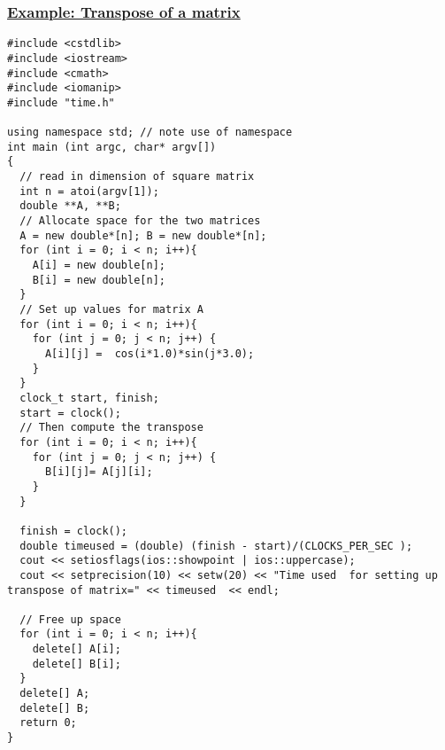 \documentclass{beamer}
\begin{document}
\begin{frame}
\frametitle{\href{{https://github.com/CompPhysics/ComputationalPhysicsMSU/blob/master/doc/Programs/LecturePrograms/programs/Classes/cpp/program8.cpp}}{Example: Transpose of a matrix}}

\begin{Verbatim}[numbers=none,fontsize=\fontsize{9pt}{9pt},baselinestretch=0.95]
#include <cstdlib>
#include <iostream>
#include <cmath>
#include <iomanip>
#include "time.h"

using namespace std; // note use of namespace
int main (int argc, char* argv[])
{
  // read in dimension of square matrix
  int n = atoi(argv[1]);
  double **A, **B;
  // Allocate space for the two matrices
  A = new double*[n]; B = new double*[n];
  for (int i = 0; i < n; i++){
    A[i] = new double[n];
    B[i] = new double[n];
  }
  // Set up values for matrix A
  for (int i = 0; i < n; i++){
    for (int j = 0; j < n; j++) {
      A[i][j] =  cos(i*1.0)*sin(j*3.0);
    }
  }
  clock_t start, finish;
  start = clock();
  // Then compute the transpose
  for (int i = 0; i < n; i++){
    for (int j = 0; j < n; j++) {
      B[i][j]= A[j][i];
    }
  }

  finish = clock();
  double timeused = (double) (finish - start)/(CLOCKS_PER_SEC );
  cout << setiosflags(ios::showpoint | ios::uppercase);
  cout << setprecision(10) << setw(20) << "Time used  for setting up transpose of matrix=" << timeused  << endl;

  // Free up space
  for (int i = 0; i < n; i++){
    delete[] A[i];
    delete[] B[i];
  }
  delete[] A;
  delete[] B;
  return 0;
}


\end{Verbatim}
\end{frame}
\end{document}
